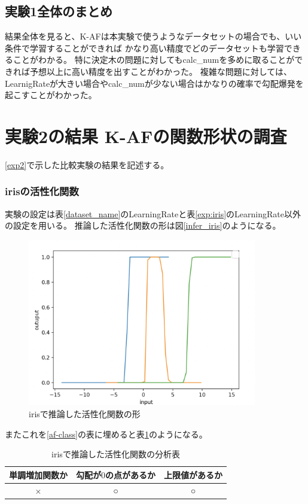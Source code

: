 \subsection{実験1全体のまとめ}
結果全体を見ると、K-AFは本実験で使うようなデータセットの場合でも、いい条件で学習することができれば
かなり高い精度でどのデータセットも学習できることがわかる。
特に決定木の問題に対してもcalc\_numを多めに取ることができれば予想以上に高い精度を出すことがわかった。
複雑な問題に対しては、LearnigRateが大きい場合やcalc\_numが少ない場合はかなりの確率で勾配爆発を起こすことがわかった。


\section{実験2の結果 K-AFの関数形状の調査}
\label{evo2}
\ref{exp2}で示した比較実験の結果を記述する。





\subsubsection{irisの活性化関数}
実験の設定は表\ref{dataset_name}のLearningRateと表\ref{exp:iris}のLearningRate以外の設定を用いる。
推論した活性化関数の形は図\ref{infer_iris}のようになる。
\begin{figure}[hbtp]
    \begin{center}
        \includegraphics[width=10cm]{asset/iris-0.1.png}
            \caption{irisで推論した活性化関数の形}
            \label{ifer_iris}
    \end{center}
\end{figure}

またこれを\ref{af-class}の表に埋めると表\ref{anal_iris}のようになる。
\begin{table}[htbp]
    \begin{center}
        \caption{irisで推論した活性化関数の分析表}
        \label{anal_iris}
        \vspace{2mm} 
        \begin{tabular}{ |c|c|c| }
        単調増加関数か & 勾配が$ 0 $の点があるか & 上限値があるか   \\
        \hline
        × & ○ & ○   \\
        \end{tabular}
    \end{center}
\end{table}



